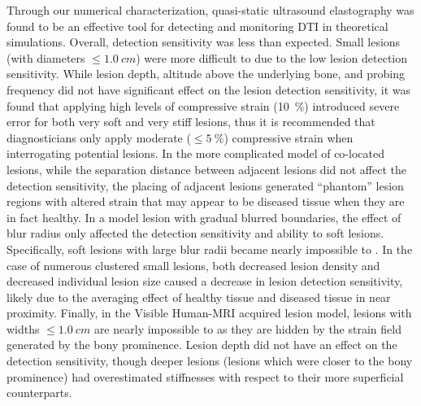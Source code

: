 		Through our numerical characterization, quasi-static ultrasound elastography was found to be an effective tool for detecting and monitoring DTI in theoretical simulations. Overall, detection sensitivity was less than expected. Small lesions (with diameters $\leq \SI{1.0}{cm}$) were more difficult to  due to the low lesion detection sensitivity. While lesion depth, altitude above the underlying bone, and probing frequency did not have significant effect on the lesion detection sensitivity, it was found that applying high levels of compressive strain (\SI{10}{\percent}) introduced severe error for both very soft and very stiff lesions, thus it is recommended that diagnosticians only apply moderate ($\leq \SI{5}{\percent}$) compressive strain when interrogating potential lesions. In the more complicated model of co-located lesions, while the separation distance between adjacent lesions did not affect the detection sensitivity, the placing of adjacent lesions generated ``phantom'' lesion regions with altered strain that may appear to be diseased tissue when they are in fact healthy. In a model lesion with gradual blurred boundaries, the effect of blur radius only affected the detection sensitivity and ability to  soft lesions. Specifically, soft lesions with large blur radii became nearly impossible to . In the case of numerous clustered small lesions, both decreased lesion density and decreased individual lesion size caused a decrease in lesion detection sensitivity, likely due to the averaging effect of healthy tissue and diseased tissue in near proximity. Finally, in the Visible Human-MRI acquired lesion model, lesions with widths $\leq \SI{1.0}{cm}$ are nearly impossible to  as they are hidden by the strain field generated by the bony prominence. Lesion depth did not have an effect on the detection sensitivity, though deeper lesions (lesions which were closer to the bony prominence) had overestimated stiffnesses with respect to their more superficial counterparts.


